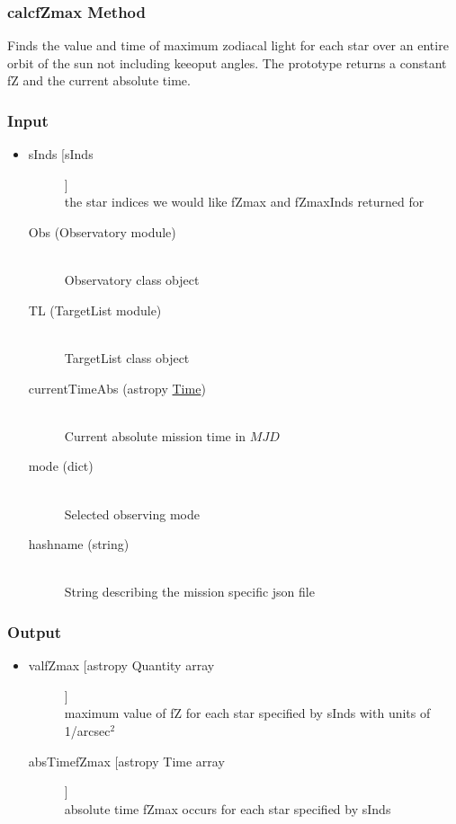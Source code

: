 \documentclass[cleanfoot]{asme2ej}
\begin{document}
\subsubsection{calcfZmax Method} \label{sec:calcfZmaxtask}
Finds the value and time of maximum zodiacal light for each star over an entire orbit of the sun not including keeoput angles. The prototype returns a constant fZ and the current absolute time.
\subsubsection*{Input}
\begin{itemize}
\item
\begin{description}
    \item[sInds [sInds]] \hfill \\ the star indices we would like fZmax and fZmaxInds returned for
    \item[Obs (Observatory module)] \hfill \\ Observatory class object
    \item[TL (TargetList module)] \hfill \\ TargetList class object
    \item[currentTimeAbs (astropy \href{http://astropy.readthedocs.org/en/latest/time/index.html}{Time})] \hfill \\ Current absolute mission time in $ MJD $
    \item[mode (dict)] \hfill \\ Selected observing mode
    \item[hashname (string)] \hfill \\ String describing the mission specific json file
\end{description}
\end{itemize}
\subsubsection*{Output}
\begin{itemize}
\item
\begin{description}
    \item[valfZmax [astropy Quantity array]] \hfill \\ maximum value of fZ for each star specified by sInds with units of 1/arcsec$^2$
    \item[absTimefZmax [astropy Time array]] \hfill \\ absolute time fZmax occurs for each star specified by sInds
\end{description}
\end{itemize}
\end{document}
